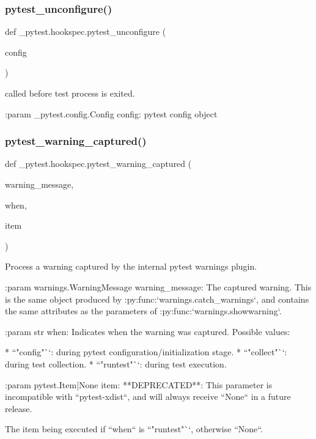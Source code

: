 \subsubsection{\texorpdfstring{pytest\+\_\+unconfigure()}{pytest\_unconfigure()}}
{\footnotesize\ttfamily def \+\_\+pytest.\+hookspec.\+pytest\+\_\+unconfigure (\begin{DoxyParamCaption}\item[{}]{config }\end{DoxyParamCaption})}

\begin{DoxyVerb}called before test process is exited.

:param _pytest.config.Config config: pytest config object
\end{DoxyVerb}
 \mbox{\label{namespace__pytest_1_1hookspec_a486765fb20868c692449f370cc841b93}} 
\subsubsection{\texorpdfstring{pytest\+\_\+warning\+\_\+captured()}{pytest\_warning\_captured()}}
{\footnotesize\ttfamily def \+\_\+pytest.\+hookspec.\+pytest\+\_\+warning\+\_\+captured (\begin{DoxyParamCaption}\item[{}]{warning\+\_\+message,  }\item[{}]{when,  }\item[{}]{item }\end{DoxyParamCaption})}

\begin{DoxyVerb}Process a warning captured by the internal pytest warnings plugin.

:param warnings.WarningMessage warning_message:
    The captured warning. This is the same object produced by :py:func:`warnings.catch_warnings`, and contains
    the same attributes as the parameters of :py:func:`warnings.showwarning`.

:param str when:
    Indicates when the warning was captured. Possible values:

    * ``"config"``: during pytest configuration/initialization stage.
    * ``"collect"``: during test collection.
    * ``"runtest"``: during test execution.

:param pytest.Item|None item:
    **DEPRECATED**: This parameter is incompatible with ``pytest-xdist``, and will always receive ``None``
    in a future release.

    The item being executed if ``when`` is ``"runtest"``, otherwise ``None``.
\end{DoxyVerb}
 